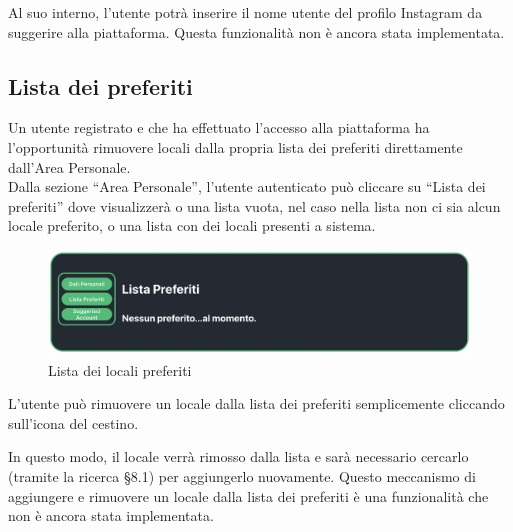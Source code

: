 Al suo interno, l’utente potrà inserire il nome utente del profilo Instagram da suggerire alla piattaforma. Questa funzionalità non è ancora stata implementata.

\subsection{Lista dei preferiti}

Un utente registrato e che ha effettuato l’accesso alla piattaforma ha l’opportunità rimuovere locali dalla propria lista dei preferiti direttamente dall'Area Personale. \\

Dalla sezione “Area Personale”, l’utente autenticato può cliccare su “Lista dei preferiti” dove visualizzerà o una lista vuota, nel caso nella lista non ci sia alcun locale preferito, o una lista con dei locali presenti a sistema.

\begin{figure}[H]
\centering
\includegraphics[scale=0.4]{./images/AreaPersonale/ListaPreferiti.png} 
\caption{Lista dei locali preferiti}
\end{figure}

L’utente può rimuovere un locale dalla lista dei preferiti semplicemente cliccando sull’icona del cestino.

In questo modo, il locale verrà rimosso dalla lista e sarà necessario cercarlo (tramite la ricerca \S{8.1}) per aggiungerlo nuovamente. Questo meccanismo di aggiungere e rimuovere un locale dalla lista dei preferiti è una funzionalità che non è ancora stata implementata.
